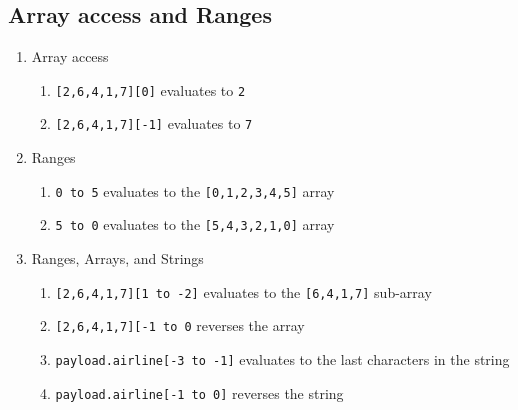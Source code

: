 \subsection{Array access and Ranges}
\begin{enumerate}[resume*]
\item Array access
  \begin{enumerate}
  \item \texttt{[2,6,4,1,7][0]} evaluates to \texttt{2}
  \item \texttt{[2,6,4,1,7][-1]} evaluates to \texttt{7}
  \end{enumerate}
\item Ranges
  \begin{enumerate}
  \item \texttt{0 to 5} evaluates to the \texttt{[0,1,2,3,4,5]} array 
  \item \texttt{5 to 0} evaluates to the \texttt{[5,4,3,2,1,0]} array
  \end{enumerate}
\item Ranges, Arrays, and Strings
  \begin{enumerate}
  \item \texttt{[2,6,4,1,7][1 to -2]} evaluates to the \texttt{[6,4,1,7]} sub-array
  \item \texttt{[2,6,4,1,7][-1 to 0} reverses the array
  \item \texttt{payload.airline[-3 to -1]} evaluates to the last characters in the string
  \item \texttt{payload.airline[-1 to 0]} reverses the string
  \end{enumerate}
\end{enumerate}


